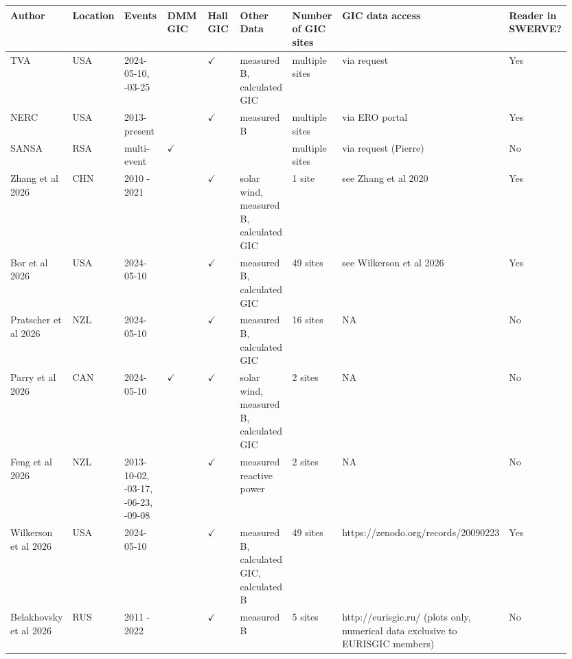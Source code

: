 \begin{longtable}{p{0.106\linewidth}p{0.106\linewidth}p{0.106\linewidth}p{0.106\linewidth}p{0.106\linewidth}p{0.106\linewidth}p{0.106\linewidth}p{0.106\linewidth}p{0.106\linewidth}}
\hline
Author & Location & Events & DMM GIC & Hall GIC & Other Data & Number of GIC sites & GIC data access & Reader in SWERVE? \\ \hline
\endhead
TVA & USA & 2024-05-10, \newline 2023-03-25 &  & $\checkmark$ & measured B, \newline calculated GIC & multiple sites & via request & Yes \\ \hline
NERC & USA & 2013-present &  & $\checkmark$ & measured B & multiple sites & via ERO portal & Yes \\ \hline
SANSA & RSA & multi-event & $\checkmark$ &  &  & multiple sites & via request (Pierre) & No \\ \hline
Zhang et al 2026 & CHN & 2010 - 2021 &  & $\checkmark$ & solar wind, \newline measured B, \newline calculated GIC & 1 site & see Zhang et al 2020 & Yes \\ \hline
Bor et al 2026 & USA & 2024-05-10 &  & $\checkmark$ & measured B, \newline calculated GIC & 49 sites & see Wilkerson et al 2026 & Yes \\ \hline
Pratscher et al 2026 & NZL & 2024-05-10 &  & $\checkmark$ & measured B, \newline calculated GIC & 16 sites & NA & No \\ \hline
Parry et al 2026 & CAN & 2024-05-10 & $\checkmark$ & $\checkmark$ & solar wind, \newline measured B, \newline calculated GIC & 2 sites & NA & No \\ \hline
Feng et al 2026 & NZL & 2013-10-02, \newline 2015-03-17, \newline 2015-06-23, \newline 2017-09-08 &  & $\checkmark$ & measured reactive power & 2 sites & NA & No \\ \hline
Wilkerson et al 2026 & USA & 2024-05-10 &  & $\checkmark$ & measured B, \newline calculated GIC, \newline calculated B & 49 sites & https://zenodo.org/records/20090223 & Yes \\ \hline
Belakhovsky et al 2026 & RUS & 2011 - 2022 &  & $\checkmark$ & measured B & 5 sites & http://eurisgic.ru/ (plots only, \newline numerical data exclusive to EURISGIC members) & No \\ \hline

\end{longtable}
